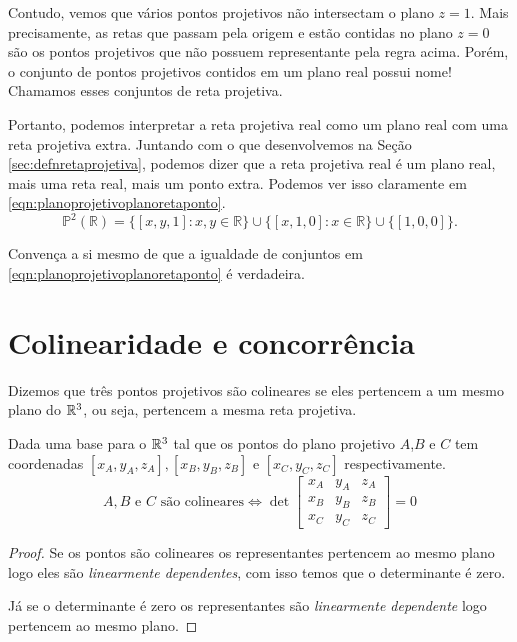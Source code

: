 Contudo, vemos que vários pontos projetivos não intersectam o plano \(z = 1\).
Mais precisamente, as retas que passam pela origem e estão contidas no plano \(z = 0\) são os pontos projetivos que não possuem representante pela regra acima.
Porém, o conjunto de pontos projetivos contidos em um plano real possui nome!
Chamamos esses conjuntos de reta projetiva.

Portanto, podemos interpretar a reta projetiva real como um plano real com uma reta projetiva extra.
Juntando com o que desenvolvemos na Seção \ref{sec:defnretaprojetiva}, podemos dizer que a reta projetiva real é um plano real, mais uma reta real, mais um ponto extra.
Podemos ver isso claramente em \ref{eqn:planoprojetivoplanoretaponto}.
\begin{equation} \label{eqn:planoprojetivoplanoretaponto}
  \mathbb{P}^2(\mathbb{R}) = \{ [x, y, 1] : x, y \in \mathbb{R} \} \cup \{[x, 1, 0] : x \in \mathbb{R}\} \cup \{[1, 0, 0]\}.
\end{equation}

\begin{exer}
  Convença a si mesmo de que a igualdade de conjuntos em \ref{eqn:planoprojetivoplanoretaponto} é verdadeira.
\end{exer}

\section{Colinearidade e concorrência}
\begin{defn}
Dizemos que três pontos projetivos são colineares se eles pertencem a um mesmo plano do $\mathbb{R}^3$, ou seja, pertencem a mesma reta projetiva.
\end{defn}

\begin{thm}
Dada uma base para o $\mathbb{R}^3$ tal que os pontos do plano projetivo $A$,$B$ e $C$ tem coordenadas $[x_A,y_A,z_A], [x_B,y_B,z_B]$ e $[x_C,y_C,z_C]$ respectivamente. 
\[A,B \text{ e } C \text{ são colineares} \iff \det \begin{bmatrix} x_A & y_A & z_A \\ x_B & y_B & z_B \\ x_C & y_C & z_C \end{bmatrix} = 0\]
\end{thm}

\begin{proof}
Se os pontos são colineares os representantes pertencem ao mesmo plano logo eles são \textit{linearmente dependentes}, com isso temos que o determinante é zero.

Já se o determinante é zero os representantes são \textit{linearmente dependente} logo pertencem ao mesmo plano.
\end{proof}

